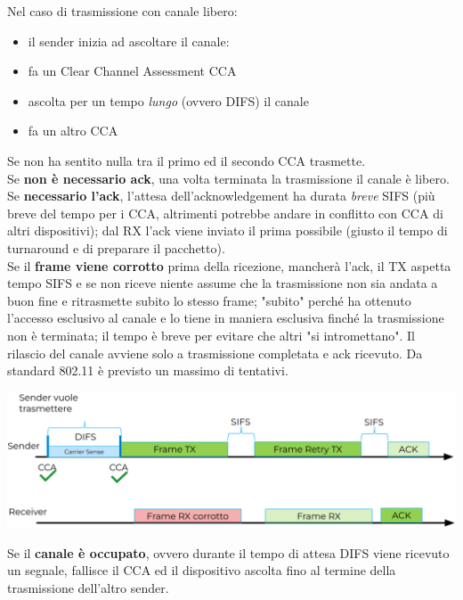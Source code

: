 \newpage

Nel caso di trasmissione con canale libero:
\begin{itemize}
	\item il sender inizia ad ascoltare il canale: 
	\item fa un Clear Channel Assessment CCA
	\item ascolta per un tempo \textit{lungo} (ovvero DIFS) il canale
	\item fa un altro CCA
\end{itemize}
Se non ha sentito nulla tra il primo ed il secondo CCA trasmette.\\

Se \textbf{non è necessario ack}, una volta terminata la trasmissione il canale è libero.\\

Se \textbf{necessario l'ack}, l'attesa dell'acknowledgement ha durata \textit{breve} SIFS (più breve del tempo per i CCA, altrimenti potrebbe andare in conflitto con CCA di altri dispositivi); dal RX l'ack viene inviato il prima possibile (giusto il tempo di turnaround e di preparare il pacchetto).\\

Se il \textbf{frame viene corrotto} prima della ricezione, mancherà l'ack, il TX aspetta tempo SIFS e se non riceve niente assume che la trasmissione non sia andata a buon fine e ritrasmette subito lo stesso frame; "subito" perché ha ottenuto l'accesso esclusivo al canale e lo tiene in maniera esclusiva finché la trasmissione non è terminata; il tempo è breve per evitare che altri "si intromettano". Il rilascio del canale avviene solo a trasmissione completata e ack ricevuto. Da standard 802.11 è previsto un massimo di tentativi.
\begin{center}
	\includegraphics[width=0.98\linewidth]{img/wlan/dcfcsmaca}
\end{center}

Se il \textbf{canale è occupato}, ovvero durante il tempo di attesa DIFS viene ricevuto un segnale, fallisce il CCA ed il dispositivo ascolta fino al termine della trasmissione dell'altro sender.\\

